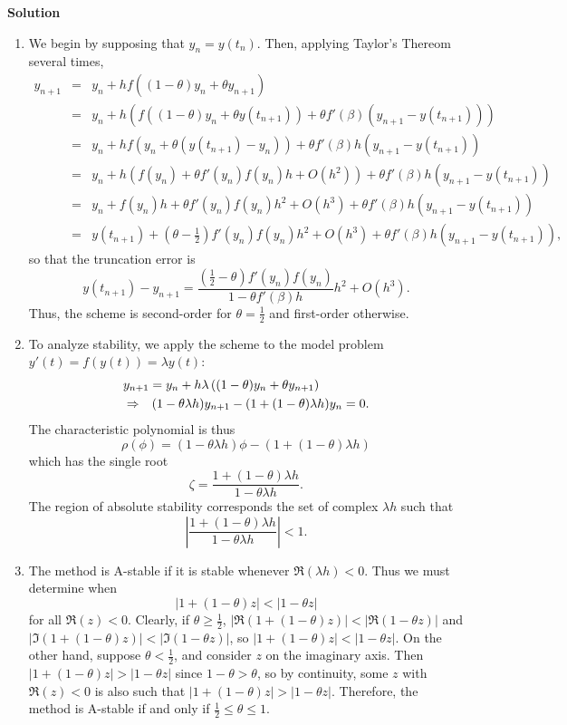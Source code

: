 \documentclass{article}
\begin{document}
\begin{enumerate}
{\bf Solution}

\begin{enumerate}
\item We begin by supposing that \(y_n = y(t_n)\).  Then, applying Taylor's Thereom several times,
\begin{eqnarray*}
y_{n + 1} & = & y_n + h f \left( (1 - \theta) y_n + \theta y_{n + 1} \right) \\
          & = & y_n + h \left( f \left( (1 - \theta) y_n + \theta y(t_{n + 1}) \right) + \theta f'(\beta) (y_{n + 1} - y(t_{n + 1})) \right) \\
          & = & y_n + h f \left( y_n + \theta (y(t_{n + 1}) - y_n) \right) + \theta f'(\beta) h (y_{n + 1} - y(t_{n + 1})) \\
          & = & y_n + h \left( f(y_n) + \theta f'(y_n) f(y_n) h + O(h^2) \right) + \theta f'(\beta) h (y_{n + 1} - y(t_{n + 1})) \\
          & = & y_n + f(y_n) h + \theta f'(y_n) f(y_n) h^2 + O(h^3) + \theta f'(\beta) h (y_{n + 1} - y(t_{n + 1})) \\
          & = & y(t_{n + 1}) + \left( \theta - \frac{1}{2} \right) f'(y_n) f(y_n) h^2 + O(h^3) + \theta f'(\beta) h (y_{n + 1} - y(t_{n + 1})),
\end{eqnarray*}
so that the truncation error is
\[y(t_{n + 1}) - y_{n + 1}
  = \frac{\left( \frac{1}{2} - \theta \right) f'(y_n) f(y_n)}{1 - \theta f'(\beta) h} h^2 + O(h^3).\]
Thus, the scheme is second-order for \(\theta = \frac{1}{2}\) and first-order otherwise.

\item To analyze stability, we apply the scheme to the model problem \(y'(t) = f(y(t)) = \lambda y(t)\):
\begin{eqnarray*}
\lefteqn{y_{n + 1} = y_n + h \lambda \left( (1 - \theta) y_n + \theta y_{n + 1} \right)} \\
& \Rightarrow & (1 - \theta \lambda h) y_{n + 1} - (1 + (1 - \theta) \lambda h) y_n = 0.
\end{eqnarray*}
The characteristic polynomial is thus
\[\rho(\phi) = (1 - \theta \lambda h) \phi - (1 + (1 - \theta) \lambda h)\]
which has the single root
\[\zeta = \frac{1 + (1 - \theta) \lambda h}{1 - \theta \lambda h}.\]
The region of absolute stability corresponds the set of complex \(\lambda h\) such that
\[\left| \frac{1 + (1 - \theta) \lambda h}{1 - \theta \lambda h} \right| < 1.\]

\item The method is A-stable if it is stable whenever \(\Re(\lambda h) < 0\).  Thus we must determine when
\[|1 + (1 - \theta) z| < |1 - \theta z|\]
for all \(\Re(z) < 0\).  Clearly, if \(\theta \geq \frac{1}{2}\), \(|\Re(1 + (1 - \theta) z)| < |\Re(1 - \theta z)|\) and \(|\Im(1 + (1 - \theta) z)| < |\Im(1 - \theta z)|\), so \(|1 + (1 - \theta) z| < |1 - \theta z|\).  On the other hand, suppose \(\theta < \frac{1}{2}\), and consider \(z\) on the imaginary axis.  Then \(|1 + (1 - \theta) z| > |1 - \theta z|\) since \(1 - \theta > \theta\), so by continuity, some \(z\) with \(\Re(z) < 0\) is also such that \(|1 + (1 - \theta) z| > |1 - \theta z|\).  Therefore, the method is A-stable if and only if \(\frac{1}{2} \leq \theta \leq 1\).


\end{enumerate}
\end{enumerate}
\end{document}
